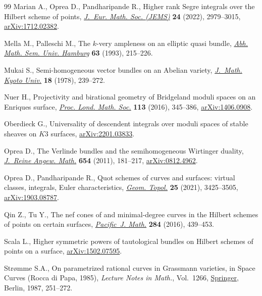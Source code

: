 \documentclass[10pt,a4paper]{amsart}
\numberwithin{equation}{section}
\begin{document}
\begin{thebibliography}{99}
Marian A., Oprea D., Pandharipande R., Higher rank {S}egre integrals over the
 {H}ilbert scheme of points, \href{https://doi.org/10.4171/jems/1149}{\textit{J.~Eur. Math. Soc. (JEMS)}} \textbf{24}
 (2022), 2979--3015, \href{https://arxiv.org/abs/1712.02382}{arXiv:1712.02382}.

Mella M., Palleschi M., The {$k$}-very ampleness on an elliptic quasi bundle,
 \href{https://doi.org/10.1007/BF02941343}{\textit{Abh. Math. Sem. Univ. Hamburg}} \textbf{63} (1993), 215--226.

Mukai S., Semi-homogeneous vector bundles on an {A}belian variety,
 \href{https://doi.org/10.1215/kjm/1250522574}{\textit{J.~Math. Kyoto Univ.}} \textbf{18} (1978), 239--272.

Nuer H., Projectivity and birational geometry of {B}ridgeland moduli spaces on
 an {E}nriques surface, \href{https://doi.org/10.1112/plms/pdw033}{\textit{Proc. Lond. Math. Soc.}} \textbf{113} (2016),
 345--386, \href{https://arxiv.org/abs/1406.0908}{arXiv:1406.0908}.

Oberdieck G., Universality of descendent integrals over moduli spaces of stable
 sheaves on $K3$ surfaces, \href{https://arxiv.org/abs/2201.03833}{arXiv:2201.03833}.

Oprea D., The {V}erlinde bundles and the semihomogeneous {W}irtinger duality,
 \href{https://doi.org/10.1515/CRELLE.2011.032}{\textit{J.~Reine Angew. Math.}} \textbf{654} (2011), 181--217,
 \href{https://arxiv.org/abs/0812.4962}{arXiv:0812.4962}.

Oprea D., Pandharipande R., Quot schemes of curves and surfaces: virtual
 classes, integrals, {E}uler characteristics, \href{https://doi.org/10.2140/gt.2021.25.3425}{\textit{Geom. Topol.}}
 \textbf{25} (2021), 3425--3505, \href{https://arxiv.org/abs/1903.08787}{arXiv:1903.08787}.

Qin Z., Tu Y., The nef cones of and minimal-degree curves in the {H}ilbert
 schemes of points on certain surfaces, \href{https://doi.org/10.2140/pjm.2016.284.439}{\textit{Pacific~J. Math.}} \textbf{284}
 (2016), 439--453.

Scala L., Higher symmetric powers of tautological bundles on {H}ilbert schemes
 of points on a surface, \href{https://arxiv.org/abs/1502.07595}{arXiv:1502.07595}.

Str{\o}mme S.A., On parametrized rational curves in {G}rassmann varieties, in
 Space Curves ({R}occa di {P}apa, 1985), \textit{Lecture Notes in Math.}, Vol.~1266, \href{https://doi.org/10.1007/BFb0078187}{Springer}, Berlin, 1987, 251--272.


\end{thebibliography}
\end{document}

